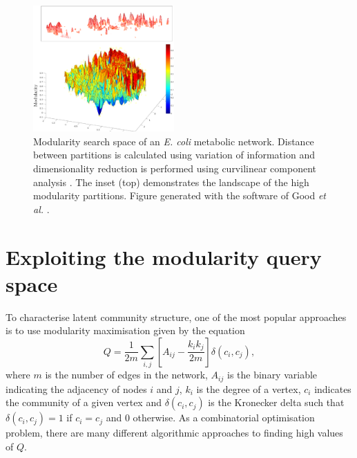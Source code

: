 \documentclass[sigconf]{acmart}
\begin{document}
\begin{figure}[t]
    \includegraphics[width=0.48\textwidth]{images/e_coli_search_space.eps}
    \caption{Modularity search space of an \textit{E. coli} metabolic network.
 Distance between partitions is calculated using variation of information \cite{meilua2003comparing} and dimensionality reduction is performed using curvilinear component analysis \cite{demartines1997curvilinear}.
  The inset (top) demonstrates the landscape of the high modularity partitions.
  Figure generated with the software of Good \textit{et al.} \cite{good2010performance}.}
    \label{fig:modular_search_space}
\end{figure}

\section{Exploiting the modularity query space}
To characterise latent community structure, one of the most popular approaches is to use modularity maximisation given by the equation \cite{newman2004}
\begin{equation}\label{eq:modularity}
  Q = \frac{1}{2m}\sum_{i,j} \left[A_{ij} - \frac{k_i k_j}{2m}\right]\delta(c_i, c_j),
\end{equation}
where $m$ is the number of edges in the network, $A_{ij}$ is the binary variable indicating the adjacency of nodes $i$ and $j$, $k_i$ is the degree of a vertex, $c_i$ indicates the community of a given vertex and $\delta(c_i, c_j)$ is the Kronecker delta such that $\delta(c_i, c_j) = 1$ if $c_i = c_j$ and $0$ otherwise.
As a combinatorial optimisation problem, there are many different algorithmic approaches to finding high values of $Q$.
\end{document}
